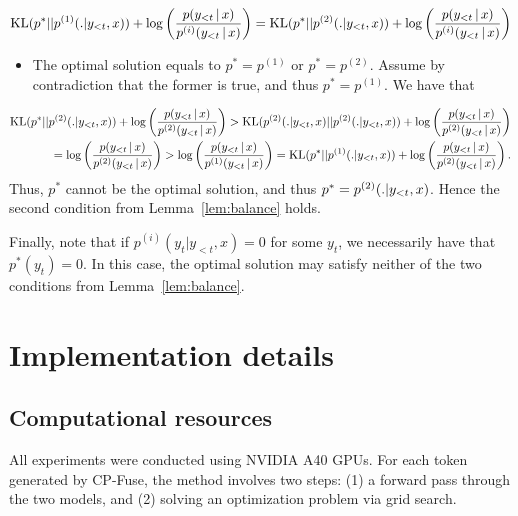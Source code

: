     \begin{equation}
        \text{KL}( p^*\vert \vert p^{(1)}(. \vert y_{<t}, x) ) + \log\left(\frac{p(y_{<t} \, | \, x)}{p^{(i)}(y_{< t} \, | \, x)} \right) = \text{KL}( p^*\vert \vert p^{(2)}(. \vert y_{<t}, x) ) + \log\left(\frac{p(y_{<t} \, | \, x)}{p^{(i)}(y_{< t} \, | \, x)} \right)
    \end{equation} 
\begin{itemize}

\item  The optimal solution equals to $p^* = p^{(1)}$ or $p^* = p^{(2)}$.  Assume by contradiction that the former is true, and thus $p^* =  p^{(1)} $. We have that
\end{itemize}

\begin{align}
     \text{KL}( p^*\vert \vert p^{(2)}(. \vert y_{<t}, x) ) + \log\left(\frac{p(y_{<t} \, | \, x)}{p^{(2)}(y_{< t} \, | \, x)} \right) >  \text{KL}( p^{(2)}(. \vert y_{<t}, x) \vert \vert p^{(2)}(. \vert y_{<t}, x) ) + \log\left(\frac{p(y_{<t} \, | \, x)}{p^{(2)}(y_{< t} \, | \, x)} \right) \\
         = \log\left(\frac{p(y_{<t} \, | \, x)}{p^{(2)}(y_{< t} \, | \, x)} \right) > \log\left(\frac{p(y_{<t} \, | \, x)}{p^{(1)}(y_{< t} \, | \, x)} \right)  =     \text{KL}( p^*\vert \vert p^{(1)}(. \vert y_{<t}, x) ) + \log\left(\frac{p(y_{<t} \, | \, x)}{p^{(2)}(y_{< t} \, | \, x)} \right).
\end{align}
Thus, $p^*$ cannot be the optimal solution, and thus $p^*= p^{(2)}(. \vert y_{<t}, x)$. Hence the second condition from Lemma~\ref{lem:balance} holds. 


Finally, note that if $p^{(i)}(y_t \vert y_{<t}, x) = 0$ for some $y_t$, we necessarily have that $p^*(y_t)=0$. In this case, the optimal solution may satisfy neither of the two conditions from Lemma~\ref{lem:balance}. 

\section{Implementation details}
 \label{app:implementation}

 \subsection{Computational resources}
\label{sec:infrastructure}

All experiments were conducted using NVIDIA A40 GPUs. For each token generated by CP-Fuse, the method involves two steps: (1) a forward pass through the two models, and (2) solving an optimization problem via grid search.

